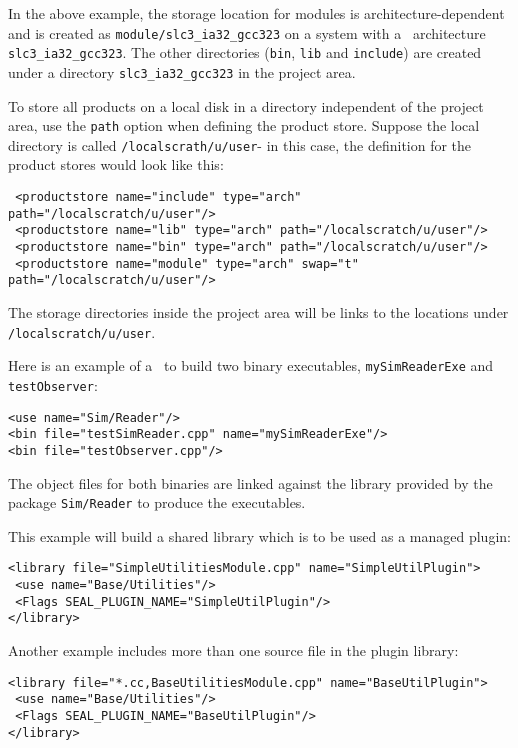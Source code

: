 \ni In the above example, the storage location for modules is architecture-dependent and is
created as \texttt{module/slc3\_ia32\_gcc323} on a system with a \scram\
architecture \texttt{slc3\_ia32\_gcc323}. The other directories
(\texttt{bin}, \texttt{lib} and \texttt{include}) are created under a
directory \texttt{slc3\_ia32\_gcc323} in the project area.

\ni To store all products on a local disk in a directory independent
of the project area, use the \texttt{path} option when defining the
product store. Suppose the local directory is called
\texttt{/localscrath/u/user}- in this case, the definition for the
product stores would look like this:

\small{
\begin{verbatim} 
 <productstore name="include" type="arch" path="/localscratch/u/user"/>
 <productstore name="lib" type="arch" path="/localscratch/u/user"/>
 <productstore name="bin" type="arch" path="/localscratch/u/user"/>
 <productstore name="module" type="arch" swap="t" path="/localscratch/u/user"/>
\end{verbatim}}\normalsize

\ni The storage directories inside the project area will be links to
the locations under \texttt{/localscratch/u/user}.

Here is an example of a \buildfile\ to build two binary executables,
\texttt{mySimReaderExe} and \texttt{testObserver}:

\small{
\begin{verbatim}
<use name="Sim/Reader"/>
<bin file="testSimReader.cpp" name="mySimReaderExe"/>
<bin file="testObserver.cpp"/>
\end{verbatim}}\normalsize

\ni The object files for both binaries are linked against the
library provided by the package \texttt{Sim/Reader} to produce the executables.

 This example will build
a shared library which is to be used as a managed plugin:

\small{
\begin{verbatim}
<library file="SimpleUtilitiesModule.cpp" name="SimpleUtilPlugin">
 <use name="Base/Utilities"/>
 <Flags SEAL_PLUGIN_NAME="SimpleUtilPlugin"/>
</library>
\end{verbatim}}\normalsize

Another example includes more than one source file in the plugin
library:

\small{
\begin{verbatim}
<library file="*.cc,BaseUtilitiesModule.cpp" name="BaseUtilPlugin">
 <use name="Base/Utilities"/>
 <Flags SEAL_PLUGIN_NAME="BaseUtilPlugin"/>
</library>
\end{verbatim}}\normalsize




